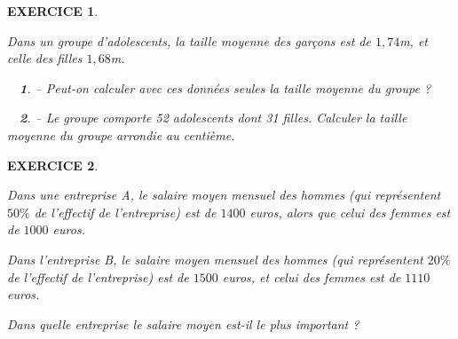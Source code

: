 \documentclass[a4paper]{article}   %
\renewcommand{\(}{\left(}
\renewcommand{\)}{\right)}
\newtheorem{ques}{~}
\newenvironment{qu}{\begin{ques}--} {\end{ques}}
\newtheorem{EXO}{\large EXERCICE }
\newenvironment{EX}   { \setcounter{ques}{0} \begin{EXO} \hrulefill ~\vspace{0.3cm}

\normalfont}    {\end{EXO} \medskip}
\begin{document}
\begin{EX} Dans un groupe d'adolescents, la taille moyenne des garçons est de $1,74$m, et celle des filles $1,68$m.
\begin{qu} Peut-on calculer avec ces données seules la taille moyenne du groupe ?
\end{qu}
\begin{qu} Le groupe comporte 52 adolescents dont 31 filles. Calculer la taille moyenne du groupe arrondie au centième.
\end{qu}
\end{EX}

\begin{EX} Dans une entreprise A, le salaire moyen mensuel des hommes (qui représentent $50\%$ de l'effectif de l'entreprise) est de $1400$ euros, alors que celui des femmes est de $1000$ euros. 

Dans l'entreprise B,  le salaire moyen mensuel des hommes (qui représentent $20\%$ de l'effectif de l'entreprise) est de $1500$ euros, et celui des femmes est de $1110$ euros. 

Dans quelle entreprise le salaire moyen est-il le plus important ?

\end{EX}
\end{document}

